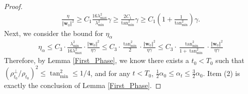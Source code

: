 \documentclass[pdflatex,sn-basic]{sn-jnl}%
\theoremstyle{thmstyleone}%
\begin{document}
\begin{appendices}
\begin{proof}
\begin{equation*}
\begin{aligned}
    \frac{\eta}{\Vert \mathbf{w}_0 \Vert^2}
    \ge
    C_1 \frac{16 \lambda_{\max}^2  }{ \lambda_{\min}^2 } \gamma 
    \ge
    \frac{2 C_1 }{ \tan_{\min}^2 } \gamma 
    \ge 
    C_1 \left(1 + \frac{1}{\tan_{\min}^2}\right) \gamma.
  \end{aligned}
  \end{equation*} 
  Next, we consider the bound for $\eta_{\alpha}$
  \begin{equation*}
  \begin{aligned}
    \eta_{\alpha} 
    \le 
    C_3 \cdot \frac{\lambda_{\min}^2}{16\lambda_{\max}^2} \cdot \frac{\Vert \mathbf{w}_0 \Vert^2}{\eta \gamma}
    \le 
    C_3 \cdot \frac{\tan_{\min}^2}{2} \cdot \frac{\Vert \mathbf{w}_0 \Vert^2}{\eta \gamma}
    \le 
    C_3 \cdot \frac{\tan_{\min}^2}{1 + \tan_{\min}^2} \cdot \frac{\Vert \mathbf{w}_0 \Vert^2}{\eta \gamma}
  \end{aligned}
  \end{equation*}
  Therefore, by Lemma \ref{First_Phase}, we know there exists a $t_0 < T_0$ such that 
  $\left( {\rho_{t_0}^\perp}/{\rho_{t_0}} \right)^2 \le \tan_{\min}^2 \le 1/4$,
  and for any $t < T_0$, $\frac{1}{2} \alpha_0 \le \alpha_{t} \le \frac{3}{2} \alpha_0$.
  Item (2) is exactly the conclusion of Lemma \ref{First_Phase}.


\end{proof}
\end{appendices}
\end{document}

